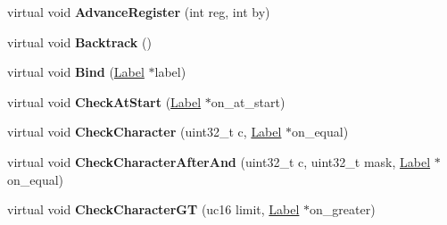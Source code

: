 \begin{DoxyCompactItemize}
\item 
virtual void {\bfseries Advance\+Register} (int reg, int by)\hypertarget{classv8_1_1internal_1_1_reg_exp_macro_assembler_m_i_p_s_a9ab2276500b78ea3c12268dd9bb4ba7c}{}\label{classv8_1_1internal_1_1_reg_exp_macro_assembler_m_i_p_s_a9ab2276500b78ea3c12268dd9bb4ba7c}

\item 
virtual void {\bfseries Backtrack} ()\hypertarget{classv8_1_1internal_1_1_reg_exp_macro_assembler_m_i_p_s_adfe2e4c2ea84a1ab5ad151218f899ded}{}\label{classv8_1_1internal_1_1_reg_exp_macro_assembler_m_i_p_s_adfe2e4c2ea84a1ab5ad151218f899ded}

\item 
virtual void {\bfseries Bind} (\hyperlink{classv8_1_1internal_1_1_label}{Label} $\ast$label)\hypertarget{classv8_1_1internal_1_1_reg_exp_macro_assembler_m_i_p_s_ac4858be1e00e71c992e568de14abe61a}{}\label{classv8_1_1internal_1_1_reg_exp_macro_assembler_m_i_p_s_ac4858be1e00e71c992e568de14abe61a}

\item 
virtual void {\bfseries Check\+At\+Start} (\hyperlink{classv8_1_1internal_1_1_label}{Label} $\ast$on\+\_\+at\+\_\+start)\hypertarget{classv8_1_1internal_1_1_reg_exp_macro_assembler_m_i_p_s_a0f87ac84fa8e60eeafa27e85b258b6ab}{}\label{classv8_1_1internal_1_1_reg_exp_macro_assembler_m_i_p_s_a0f87ac84fa8e60eeafa27e85b258b6ab}

\item 
virtual void {\bfseries Check\+Character} (uint32\+\_\+t c, \hyperlink{classv8_1_1internal_1_1_label}{Label} $\ast$on\+\_\+equal)\hypertarget{classv8_1_1internal_1_1_reg_exp_macro_assembler_m_i_p_s_a0139c180148c5b5ba2ddbd15bbeaa7f9}{}\label{classv8_1_1internal_1_1_reg_exp_macro_assembler_m_i_p_s_a0139c180148c5b5ba2ddbd15bbeaa7f9}

\item 
virtual void {\bfseries Check\+Character\+After\+And} (uint32\+\_\+t c, uint32\+\_\+t mask, \hyperlink{classv8_1_1internal_1_1_label}{Label} $\ast$on\+\_\+equal)\hypertarget{classv8_1_1internal_1_1_reg_exp_macro_assembler_m_i_p_s_a384cf9c589f2b7346e84a5d35b359b95}{}\label{classv8_1_1internal_1_1_reg_exp_macro_assembler_m_i_p_s_a384cf9c589f2b7346e84a5d35b359b95}

\item 
virtual void {\bfseries Check\+Character\+GT} (uc16 limit, \hyperlink{classv8_1_1internal_1_1_label}{Label} $\ast$on\+\_\+greater)\hypertarget{classv8_1_1internal_1_1_reg_exp_macro_assembler_m_i_p_s_a8125957e75e4d4149e916f9a2e1fb925}{}\label{classv8_1_1internal_1_1_reg_exp_macro_assembler_m_i_p_s_a8125957e75e4d4149e916f9a2e1fb925}


\end{DoxyCompactItemize}

